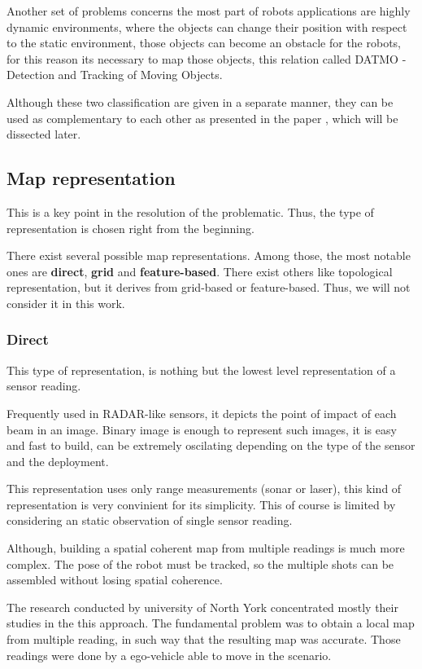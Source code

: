 Another set of problems concerns the most part of robots applications are highly dynamic environments, where the objects can change their position with respect to the static environment, those objects can become an obstacle for the robots, for this reason its necessary to map those objects, this relation called DATMO - Detection and Tracking of Moving Objects.

Although these two classification are given in a separate manner, they can be used as complementary to each other as presented in the paper \cite{Wang04a}, which will be dissected later.

\subsection{Map representation}

This is a key point in the resolution of the problematic. Thus, the type of representation is chosen right from the beginning.

There exist several possible map representations. Among those, the most notable ones are \textbf{direct}, \textbf{grid} and \textbf{feature-based}. There exist others like topological representation, but it derives from grid-based or feature-based. Thus, we will not consider it in this work.

\subsubsection{Direct}

This type of representation, is nothing but the lowest level representation of a sensor reading. 

Frequently used in RADAR-like sensors, it depicts the point of impact of each beam in an image. Binary image is enough to represent such images, it is easy and fast to build, can be extremely oscilating depending on the type of the sensor and the deployment.

This representation uses only range measurements (sonar or laser), this kind of representation is very convinient for its simplicity. This of course is limited by considering an static observation of single sensor reading. 

Although, building a spatial coherent map from multiple readings is much more complex. The pose of the robot must be tracked, so the multiple shots can be assembled without losing  spatial coherence.

The research conducted by university of North York\cite{Lu:1997:GCR:591441.591464} concentrated mostly their studies in the this approach. The fundamental problem was to obtain a local map from multiple reading, in such way that the resulting map was accurate. Those readings were done by a ego-vehicle able to move in the scenario.

